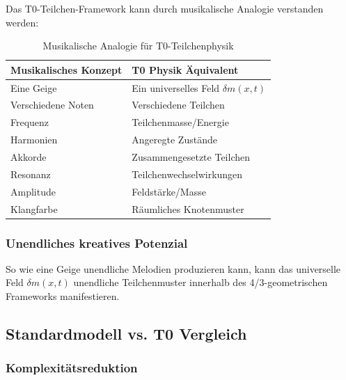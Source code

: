 	Das T0-Teilchen-Framework kann durch musikalische Analogie verstanden werden:
	
	\begin{table}[htbp]
		\centering
		\begin{tabular}{ll}
			\toprule
			\textbf{Musikalisches Konzept} & \textbf{T0 Physik Äquivalent} \\
			\midrule
			Eine Geige & Ein universelles Feld $\delta m(x,t)$ \\
			Verschiedene Noten & Verschiedene Teilchen \\
			Frequenz & Teilchenmasse/Energie \\
			Harmonien & Angeregte Zustände \\
			Akkorde & Zusammengesetzte Teilchen \\
			Resonanz & Teilchenwechselwirkungen \\
			Amplitude & Feldstärke/Masse \\
			Klangfarbe & Räumliches Knotenmuster \\
			\bottomrule
		\end{tabular}
		\caption{Musikalische Analogie für T0-Teilchenphysik}
		\label{tab:musikinstrument_analogie}
	\end{table}
	
	\subsubsection{Unendliches kreatives Potenzial}
	\label{subsubsec:unendliches_potenzial}
	
	So wie eine Geige unendliche Melodien produzieren kann, kann das universelle Feld $\delta m(x,t)$ unendliche Teilchenmuster innerhalb des 4/3-geometrischen Frameworks manifestieren.
	
	\subsection{Standardmodell vs. T0 Vergleich}
	\label{subsec:sm_vs_t0}
	
	\subsubsection{Komplexitätsreduktion}
	\label{subsubsec:komplexitaetsreduktion}
	
